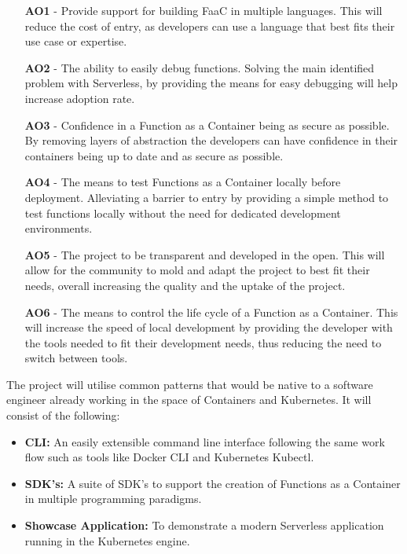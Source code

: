 \begin{itemize}
    \item [\textbf{AO1}] - Provide support for building \gls{FaaC} in multiple languages. This will reduce the cost of entry, as developers can use a language that best fits their use case or expertise.
    \item [\textbf{AO2}] - The ability to easily debug functions. Solving the main identified problem with \gls{Serverless}, by providing the means for easy debugging will help increase adoption rate.
    \item [\textbf{AO3}] - Confidence in a Function as a Container being as secure as possible. By removing layers of abstraction the developers can have confidence in their containers being up to date and as secure as possible.
    \item [\textbf{AO4}] - The means to test Functions as a Container locally before deployment. Alleviating a barrier to entry by providing a simple method to test functions locally without the need for dedicated development environments. 
    \item [\textbf{AO5}] - The project to be transparent and developed in the open. This will allow for the community to mold and adapt the project to best fit their needs, overall increasing the quality and the uptake of the project.
    \item [\textbf{AO6}] - The means to control the life cycle of a Function as a Container. This will increase the speed of local development by providing the developer with the tools needed to fit their development needs, thus reducing the need to switch between tools.
\end{itemize}

\newpage
The project will utilise common patterns that would be native to a software engineer already working in the space of \gls{Container}s and \gls{Kubernetes}. It will consist of the following:

\begin{itemize}
    \item \textbf{CLI:} An easily extensible command line interface following the same work flow such as tools like \gls{Docker} CLI and \gls{Kubernetes} Kubectl.
    \item \textbf{SDK's:} A suite of \gls{SDK}'s to support the creation of Functions as a Container in multiple programming paradigms.
    \item \textbf{Showcase Application:} To demonstrate a modern \gls{Serverless} application running in the \gls{Kubernetes} engine.
\end{itemize}

